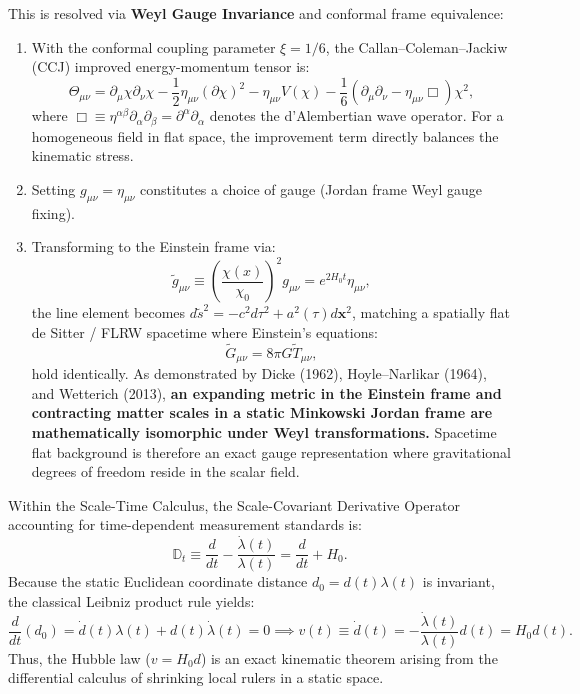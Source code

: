 \documentclass[11pt,a4paper]{article}
\begin{document}
This is resolved via \textbf{Weyl Gauge Invariance} and conformal frame equivalence:
\begin{enumerate}
    \item With the conformal coupling parameter $\xi = 1/6$, the Callan--Coleman--Jackiw (CCJ) improved energy-momentum tensor is:
    \begin{equation}
        \Theta_{\mu\nu} = \partial_\mu\chi\partial_\nu\chi - \frac{1}{2}\eta_{\mu\nu}(\partial\chi)^2 - \eta_{\mu\nu}V(\chi) - \frac{1}{6}\left(\partial_\mu\partial_\nu - \eta_{\mu\nu}\Box\right)\chi^2,
        \label{eq:ccj_tensor_en}
    \end{equation}
    where $\Box \equiv \eta^{\alpha\beta}\partial_\alpha\partial_\beta = \partial^\alpha\partial_\alpha$ denotes the d'Alembertian wave operator. For a homogeneous field in flat space, the improvement term directly balances the kinematic stress.
    \item Setting $g_{\mu\nu} = \eta_{\mu\nu}$ constitutes a choice of gauge (Jordan frame Weyl gauge fixing).
    \item Transforming to the Einstein frame via:
    \begin{equation}
        \tilde{g}_{\mu\nu} \equiv \left(\frac{\chi(x)}{\chi_0}\right)^2 g_{\mu\nu} = e^{2H_0 t} \eta_{\mu\nu},
    \end{equation}
    the line element becomes $d\tilde{s}^2 = -c^2 d\tau^2 + a^2(\tau) d\mathbf{x}^2$, matching a spatially flat de Sitter / FLRW spacetime where Einstein's equations:
    \begin{equation}
        \tilde{G}_{\mu\nu} = 8\pi G \tilde{T}_{\mu\nu},
    \end{equation}
    hold identically. As demonstrated by Dicke (1962), Hoyle--Narlikar (1964), and Wetterich (2013), \textbf{an expanding metric in the Einstein frame and contracting matter scales in a static Minkowski Jordan frame are mathematically isomorphic under Weyl transformations.} Spacetime flat background is therefore an exact gauge representation where gravitational degrees of freedom reside in the scalar field.
\end{enumerate}

Within the Scale-Time Calculus, the Scale-Covariant Derivative Operator accounting for time-dependent measurement standards is:
\begin{equation}
    \mathbb{D}_t \equiv \frac{d}{dt} - \frac{\dot{\lambda}(t)}{\lambda(t)} = \frac{d}{dt} + H_0.
    \label{eq:scale_deriv_pantheon}
\end{equation}
Because the static Euclidean coordinate distance $d_0 = d(t) \lambda(t)$ is invariant, the classical Leibniz product rule yields:
\begin{equation}
    \frac{d}{dt}(d_0) = \dot{d}(t) \lambda(t) + d(t) \dot{\lambda}(t) = 0 \implies v(t) \equiv \dot{d}(t) = -\frac{\dot{\lambda}(t)}{\lambda(t)} d(t) = H_0 d(t).
    \label{eq:hubble_product_proof}
\end{equation}
Thus, the Hubble law ($v = H_0 d$) is an exact kinematic theorem arising from the differential calculus of shrinking local rulers in a static space.
\end{document}
